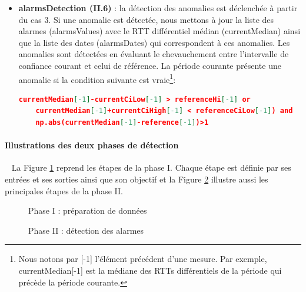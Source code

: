 \begin{itemize}
\begin{enumerate}
		
	\end{enumerate}
	\item \textbf{ alarmsDetection (II.6) }:   la détection des anomalies est déclenchée à partir du cas $3$. Si une anomalie est détectée, nous mettons à jour la liste des alarmes  {\color{gray}(alarmsValues)} avec le RTT différentiel médian (currentMedian) ainsi que la
	liste des dates  {\color{gray}(alarmsDates)} qui correspondent à ces anomalies. Les anomalies sont détectées en évaluant le chevauchement entre l'intervalle de confiance courant et celui de référence. La période courante présente une anomalie si la condition suivante est vraie\footnote{Nous notons par [-1] l'élément précédent d'une mesure. Par exemple, currentMedian[-1] est la médiane des RTTs différentiels de la période qui précède la période courante.}:
	\begin{lstlisting}[language=json,firstnumber=1, caption={Conditions de présence d'une anomalie pour un lien},
	basicstyle =\footnotesize]
	currentMedian[-1]-currentCiLow[-1] > referenceHi[-1] or
	currentMedian[-1]+currentCiHigh[-1] < referenceCiLow[-1]) and
	np.abs(currentMedian[-1]-reference[-1])>1
	\end{lstlisting}
	
	
	
\end{itemize}

\paragraph{ Illustrations des deux phases de détection}~
La Figure  \ref{fig:step-preparing-data} reprend les étapes de la phase I. Chaque étape est définie par ses entrées et
ses sorties ainsi que son objectif et
la Figure \ref{fig:step-detection-anomalies} illustre aussi les principales étapes  de la phase II.
\newpage

\begin{figure}[H]
	\centering
	\captionsetup{justification=centering}
	\resizebox{!}{\textheight}{
		
	}
	\caption{Phase I : préparation de données }
	\label{fig:step-preparing-data}
\end{figure}

\begin{figure}[H]
	\centering
	\captionsetup{justification=centering}
	\resizebox{\textwidth}{\textheight}{
		
	}
	\caption{Phase II : détection des alarmes }
	\label{fig:step-detection-anomalies}
\end{figure}




